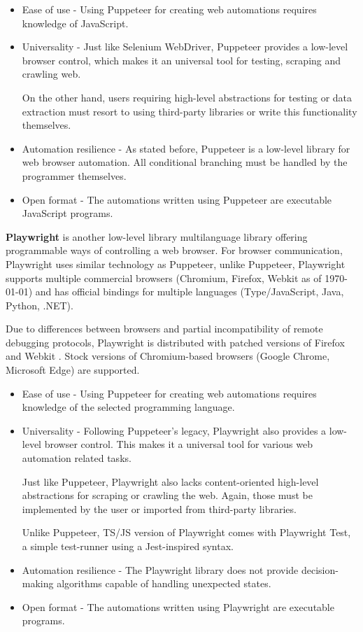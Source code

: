 \begin{itemize}
    \item Ease of use - Using Puppeteer for creating web automations requires knowledge of JavaScript.

    \item Universality - Just like Selenium WebDriver, Puppeteer provides a low-level browser control, which makes it an universal tool for testing, scraping and crawling web. 
    
    On the other hand, users requiring high-level abstractions for testing or data extraction must resort to using third-party libraries or write this functionality themselves.

    \item Automation resilience -
    As stated before, Puppeteer is a low-level library for web browser automation. All conditional branching must be handled by the programmer themselves.
    \item Open format - The automations written using Puppeteer are executable JavaScript programs.
\end{itemize}

\textbf{Playwright} is another low-level library multilanguage library offering programmable ways of controlling a web browser.
For browser communication, Playwright uses similar technology as Puppeteer, unlike Puppeteer, Playwright supports multiple commercial browsers (Chromium, Firefox, Webkit as of \today) and has official bindings for multiple languages (Type/JavaScript, Java, Python, .NET).

Due to differences between browsers and partial incompatibility of remote debugging protocols, Playwright is distributed with patched versions of Firefox and Webkit .
Stock versions of Chromium-based browsers (Google Chrome, Microsoft Edge) are supported. 


\begin{itemize}
    \item Ease of use - Using Puppeteer for creating web automations requires knowledge of the selected programming language.

    \item Universality - Following Puppeteer's legacy, Playwright also provides a low-level browser control. This makes it a universal tool for various web automation related tasks.
    
    Just like Puppeteer, Playwright also lacks content-oriented high-level abstractions for scraping or crawling the web. Again, those must be implemented by the user or imported from third-party libraries.
    
    Unlike Puppeteer, TS/JS version of Playwright comes with Playwright Test, a simple test-runner using a Jest-inspired syntax.

    \item Automation resilience -
    The Playwright library does not provide decision-making algorithms capable of handling unexpected states.

    \item Open format - The automations written using Playwright are executable programs.
\end{itemize}


